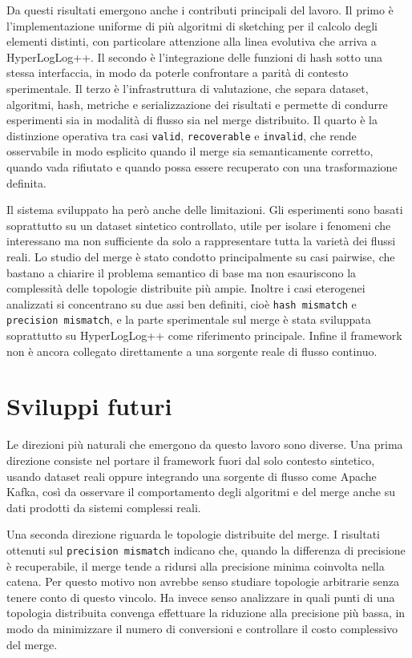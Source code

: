 Da questi risultati emergono anche i contributi principali del lavoro. Il primo
è l'implementazione uniforme di più algoritmi di sketching per il calcolo degli elementi
distinti, con particolare attenzione alla linea evolutiva che arriva a
HyperLogLog++. Il secondo è l'integrazione delle funzioni di hash sotto una
stessa interfaccia, in modo da poterle confrontare a parità di contesto
sperimentale. Il terzo è l'infrastruttura di valutazione, che separa dataset,
algoritmi, hash, metriche e serializzazione dei risultati e permette di
condurre esperimenti sia in modalità di flusso sia nel merge distribuito. Il
quarto è la distinzione operativa tra casi \texttt{valid},
\texttt{recoverable} e \texttt{invalid}, che rende osservabile in modo
esplicito quando il merge sia semanticamente corretto, quando vada rifiutato e
quando possa essere recuperato con una trasformazione definita.

Il sistema sviluppato ha però anche delle limitazioni. Gli esperimenti sono
basati soprattutto su un dataset sintetico controllato, utile per isolare i
fenomeni che interessano ma non sufficiente da solo a rappresentare tutta la
varietà dei flussi reali. Lo studio del merge è stato condotto principalmente
su casi pairwise, che bastano a chiarire il problema semantico di base ma non
esauriscono la complessità delle topologie distribuite più ampie. Inoltre i
casi eterogenei analizzati si concentrano su due assi ben definiti, cioè
\texttt{hash mismatch} e \texttt{precision mismatch}, e la parte sperimentale
sul merge è stata sviluppata soprattutto su HyperLogLog++ come riferimento
principale. Infine il framework non è ancora collegato direttamente a una
sorgente reale di flusso continuo.

\section{Sviluppi futuri}

Le direzioni più naturali che emergono da questo lavoro sono diverse. Una prima
direzione consiste nel portare il framework fuori dal solo contesto sintetico,
usando dataset reali oppure integrando una sorgente di flusso come Apache Kafka,
così da osservare il comportamento degli algoritmi e del merge anche su dati
prodotti da sistemi complessi reali.

Una seconda direzione riguarda le topologie distribuite del merge. I risultati
ottenuti sul \texttt{precision mismatch} indicano che, quando la differenza di precisione
è recuperabile, il merge tende a ridursi alla precisione minima coinvolta nella
catena. Per questo motivo non avrebbe senso studiare topologie arbitrarie senza
tenere conto di questo vincolo. Ha invece senso analizzare in quali punti di
una topologia distribuita convenga effettuare la riduzione alla precisione più
bassa, in modo da minimizzare il numero di conversioni e controllare il costo
complessivo del merge.

